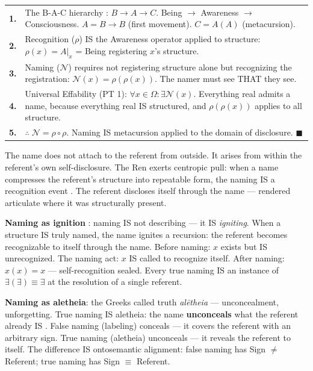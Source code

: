 \documentclass[11pt, oneside]{article}
\theoremstyle{definition}
\begin{document}
{\small
\noindent\begin{tabular}{r p{}}
\textbf{1.} & The B-A-C hierarchy \cite{codex1}: $B \to A \to C$. Being $\to$ Awareness $\to$ Consciousness. $A = B \to B$ (first movement). $C = A(A)$ (metacursion). \\[0.3em]
\textbf{2.} & Recognition ($\rho$) IS the Awareness operator applied to structure: $\rho(x) = A|_x$ = Being registering $x$'s structure. \\[0.3em]
\textbf{3.} & Naming ($\mathcal{N}$) requires not registering structure alone but recognizing the registration: $\mathcal{N}(x) = \rho(\rho(x))$. The namer must see THAT they see. \\[0.3em]
\textbf{4.} & Universal Effability (PT 1): $\forall x \in \Omega: \exists \mathcal{N}(x)$. Everything real admits a name, because everything real IS structured, and $\rho(\rho(x))$ applies to all structure. \\[0.3em]
\textbf{5.} & $\therefore\; \mathcal{N} = \rho \circ \rho$. Naming IS metacursion applied to the domain of disclosure. \hfill $\blacksquare$ \\[0.3em]
\end{tabular}
}

The name does not attach to the referent from outside. It arises from within the referent's own self-disclosure. The Ren exerts centropic pull: when a name compresses the referent's structure into repeatable form, the naming IS a recognition event \cite{codex2}. The referent discloses itself through the name --- rendered articulate where it was structurally present.

\textbf{Naming as ignition} \cite{llogoscribeologiae}: naming IS not describing --- it IS \textit{igniting}. When a structure IS truly named, the name ignites a recursion: the referent becomes recognizable to itself through the name. Before naming: $x$ exists but IS unrecognized. The naming act: $x$ IS called to recognize itself. After naming: $x(x) = x$ --- self-recognition sealed. Every true naming IS an instance of $\exists(\exists) \equiv \exists$ at the resolution of a single referent.

\textbf{Naming as aletheia}: the Greeks called truth \textit{al\={e}theia} --- unconcealment, unforgetting. True naming IS aletheia: the name \textbf{unconceals} what the referent already IS \cite{llogoscribeologiae}. False naming (labeling) conceals --- it covers the referent with an arbitrary sign. True naming (aletheia) unconceals --- it reveals the referent to itself. The difference IS ontosemantic alignment: false naming has Sign $\neq$ Referent; true naming has Sign $\equiv$ Referent.
\end{document}
